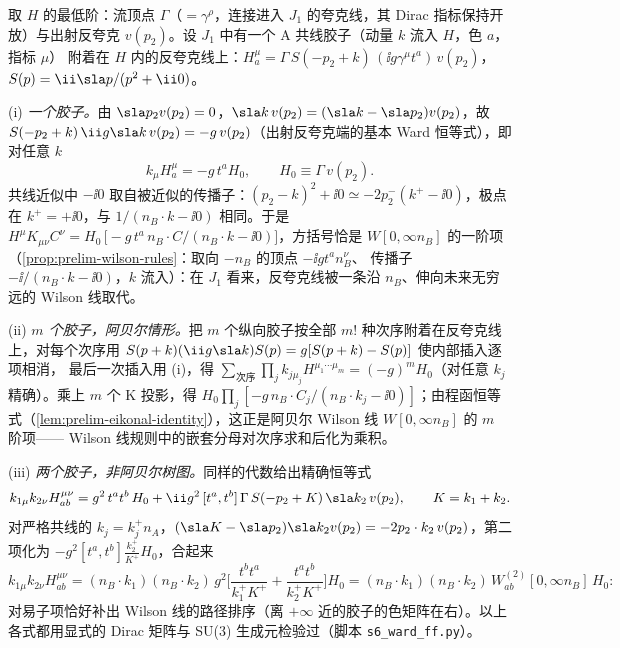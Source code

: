 \begin{example}\label{ex:sudakov-ward-wilson}
取 $H$ 的最低阶：流顶点 $\Gamma$（$=\gamma^\rho$，连接进入 $J_1$ 的夸克线，其 Dirac 指标保持开放）与出射反夸克 $v(p_2)$。设 $J_1$ 中有一个 A 共线胶子（动量 $k$ 流入 $H$，色 $a$，指标 $\mu$）
附着在 $H$ 内的反夸克线上：$H^\mu_a=\Gamma\,S(-p_2+k)\,(\ii g\gamma^\mu t^a)\,v(p_2)$，$S(p)=\ii\sla p/(p^2+\ii0)$。

(i) \emph{一个胶子。}由 $\sla p_2v(p_2)=0$，$\sla k\,v(p_2)=(\sla k-\sla p_2)v(p_2)$，故 $S(-p_2+k)\,\ii g\sla k\,v(p_2)=-g\,v(p_2)$（出射反夸克端的基本 Ward 恒等式），即对任意 $k$
\begin{equation}\label{eq:sudakov-ward1}
k_\mu H^\mu_a=-g\,t^a H_0,\qquad H_0\equiv\Gamma\,v(p_2).
\end{equation}
共线近似中 $-\ii0$ 取自被近似的传播子：$(p_2-k)^2+\ii0\simeq-2p_2^-(k^+-\ii0)$，极点在 $k^+=+\ii0$，与 $1/(n_B\cdot k-\ii0)$ 相同。于是
$H^\mu K_{\mu\nu}C^\nu=H_0\,\big[-g\,t^a\,n_B\!\cdot\!C/(n_B\cdot k-\ii0)\big]$，方括号恰是 $W[0,\infty n_B]$ 的一阶项（\cref{prop:prelim-wilson-rules}：取向 $-n_B$ 的顶点 $-\ii gt^an_B^\nu$、
传播子 $-\ii/(n_B\cdot k-\ii0)$，$k$ 流入）：在 $J_1$ 看来，反夸克线被一条沿 $n_B$、伸向未来无穷远的 Wilson 线取代。

(ii) \emph{$m$ 个胶子，阿贝尔情形。}把 $m$ 个纵向胶子按全部 $m!$ 种次序附着在反夸克线上，对每个次序用 $S(p+k)(\ii g\sla k)S(p)=g[S(p+k)-S(p)]$ 使内部插入逐项相消，
最后一次插入用 (i)，得 $\sum_{\text{次序}}\prod_jk_{j\mu_j}H^{\mu_1\cdots\mu_m}=(-g)^mH_0$（对任意 $k_j$ 精确）。乘上 $m$ 个 K 投影，得
$H_0\prod_j[-g\,n_B\cdot C_j/(n_B\cdot k_j-\ii0)]$；由程函恒等式（\cref{lem:prelim-eikonal-identity}），这正是阿贝尔 Wilson 线 $W[0,\infty n_B]$ 的 $m$ 阶项——
Wilson 线规则中的嵌套分母对次序求和后化为乘积。

(iii) \emph{两个胶子，非阿贝尔树图。}同样的代数给出精确恒等式
\begin{equation}\label{eq:sudakov-ward2}
k_{1\mu}k_{2\nu}H^{\mu\nu}_{ab}=g^2\,t^at^b\,H_0+\ii g^2\,[t^a,t^b]\,\Gamma\,S(-p_2+K)\,\sla k_2\,v(p_2),\qquad K=k_1+k_2 .
\end{equation}
对严格共线的 $k_j=k_j^+n_A$，$(\sla K-\sla p_2)\sla k_2v(p_2)=-2p_2\cdot k_2\,v(p_2)$，第二项化为 $-g^2[t^a,t^b]\frac{k_2^+}{K^+}H_0$，合起来
\[
k_{1\mu}k_{2\nu}H^{\mu\nu}_{ab}=(n_B\!\cdot\!k_1)(n_B\!\cdot\!k_2)\,g^2\Big[\frac{t^bt^a}{k_1^+K^+}+\frac{t^at^b}{k_2^+K^+}\Big]H_0
=(n_B\!\cdot\!k_1)(n_B\!\cdot\!k_2)\,W^{(2)}_{ab}[0,\infty n_B]\,H_0 :
\]
对易子项恰好补出 Wilson 线的路径排序（离 $+\infty$ 近的胶子的色矩阵在右）。以上各式都用显式的 Dirac 矩阵与 SU(3) 生成元检验过（脚本 \texttt{s6\_ward\_ff.py}）。
\end{example}


